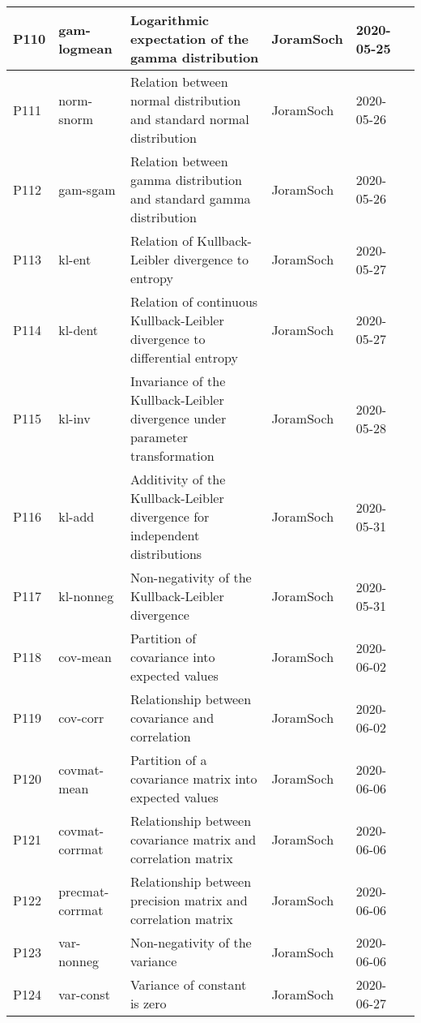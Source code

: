 \documentclass[a4paper,12pt,twoside]{book}
\begin{document}
\begin{longtable}{|p{1cm}|p{2cm}|p{6.5cm}|p{3cm}|p{2cm}|c|}
P110 & gam-logmean & Logarithmic expectation of the gamma distribution & JoramSoch & 2020-05-25 & \pageref{sec:gam-logmean} \\ \hline
P111 & norm-snorm & Relation between normal distribution and standard normal distribution & JoramSoch & 2020-05-26 & \pageref{sec:norm-snorm} \\ \hline
P112 & gam-sgam & Relation between gamma distribution and standard gamma distribution & JoramSoch & 2020-05-26 & \pageref{sec:gam-sgam} \\ \hline
P113 & kl-ent & Relation of Kullback-Leibler divergence to entropy & JoramSoch & 2020-05-27 & \pageref{sec:kl-ent} \\ \hline
P114 & kl-dent & Relation of continuous Kullback-Leibler divergence to differential entropy & JoramSoch & 2020-05-27 & \pageref{sec:kl-dent} \\ \hline
P115 & kl-inv & Invariance of the Kullback-Leibler divergence under parameter transformation & JoramSoch & 2020-05-28 & \pageref{sec:kl-inv} \\ \hline
P116 & kl-add & Additivity of the Kullback-Leibler divergence for independent distributions & JoramSoch & 2020-05-31 & \pageref{sec:kl-add} \\ \hline
P117 & kl-nonneg & Non-negativity of the Kullback-Leibler divergence & JoramSoch & 2020-05-31 & \pageref{sec:kl-nonneg} \\ \hline
P118 & cov-mean & Partition of covariance into expected values & JoramSoch & 2020-06-02 & \pageref{sec:cov-mean} \\ \hline
P119 & cov-corr & Relationship between covariance and correlation & JoramSoch & 2020-06-02 & \pageref{sec:cov-corr} \\ \hline
P120 & covmat-mean & Partition of a covariance matrix into expected values & JoramSoch & 2020-06-06 & \pageref{sec:covmat-mean} \\ \hline
P121 & covmat-corrmat & Relationship between covariance matrix and correlation matrix & JoramSoch & 2020-06-06 & \pageref{sec:covmat-corrmat} \\ \hline
P122 & precmat-corrmat & Relationship between precision matrix and correlation matrix & JoramSoch & 2020-06-06 & \pageref{sec:precmat-corrmat} \\ \hline
P123 & var-nonneg & Non-negativity of the variance & JoramSoch & 2020-06-06 & \pageref{sec:var-nonneg} \\ \hline
P124 & var-const & Variance of constant is zero & JoramSoch & 2020-06-27 & \pageref{sec:var-const} \\ \hline

\end{longtable}
\end{document}
